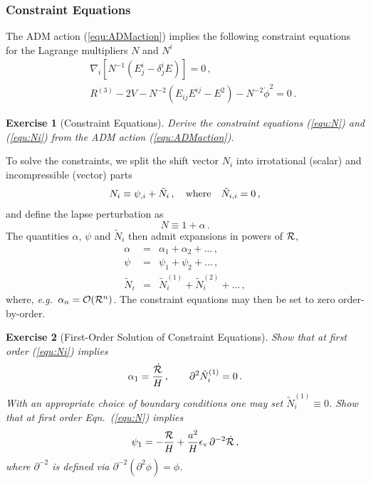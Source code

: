 \documentclass[12pt,letterpaper,rotate]{article}
\def\beq{\begin{equation}}
\def\eeq{\end{equation}}
\def\bea{\begin{eqnarray}}
\def\eea{\end{eqnarray}}
\def\R{{\cal R}}
\newtheorem{thm}{Exercise}
\begin{document}
{\subsubsection{Constraint Equations}
The ADM action (\ref{equ:ADMaction}) implies the following constraint equations for the Lagrange multipliers $N$ and $N^i$
\bea
&& \nabla_i [N^{-1} (E^i_j - \delta^i_j E)] = 0\, , \label{equ:N}\\
&& R^{(3)} - 2 V - N^{-2} (E_{ij} E^{ij} - E^2) - N^{-2} \dot \phi^2 = 0 \label{equ:Ni}\, .
\eea

\begin{thm}[Constraint Equations]
Derive the constraint equations (\ref{equ:N}) and (\ref{equ:Ni}) from the ADM action (\ref{equ:ADMaction}).  
 \end{thm}

To solve the constraints, we split the shift vector $N_i$ into irrotational (scalar) and incompressible (vector) parts
\beq
N_i \equiv \psi_{, i} + \tilde N_i\, , \quad {\rm where} \quad \tilde N_{i,i} = 0\, ,
\eeq
and define the lapse perturbation as
\beq
N \equiv 1 + \alpha\, .
\eeq
 The quantities $\alpha$, $\psi$ and $\tilde N_i$ then admit expansions in powers of $\R$, 
 \bea
 \alpha &=&  \alpha_1+ \alpha_2+ \dots \, , \nonumber \\
 \psi &=& \psi_1+\psi_2 + \dots\, , \nonumber \\
 \tilde N_i &=& \tilde N_i^{(1)} + \tilde N_i^{(2)} + \dots \, ,
 \eea
 where, {\it e.g.}~$\alpha_n ={\cal O}(\R^n)$.
 The constraint equations may then be set to zero order-by-order.
 
 \begin{thm}[First-Order Solution of Constraint Equations]
 
 Show that at first order (\ref{equ:Ni}) implies
 \beq
 \label{equ:a1}
\alpha_1 = \frac{\dot \R}{H}\, , \qquad \partial^2 \tilde N_i^{(1)} = 0\, .
\eeq
 With an appropriate choice of boundary conditions one may set $\tilde N_i^{(1)} \equiv 0$.
 Show that at first order Eqn.~(\ref{equ:N}) implies
 \beq
 \label{equ:psi1}
 \psi_1 = - \frac{\R}{H} + \frac{a^2}{H} \epsilon_{\rm v}\, \partial^{-2} \dot \R\, ,
 \eeq
 where $\partial^{-2}$ is defined via $\partial^{-2} (\partial^2 \phi) = \phi$.
\end{thm}
 


}
\end{document}
